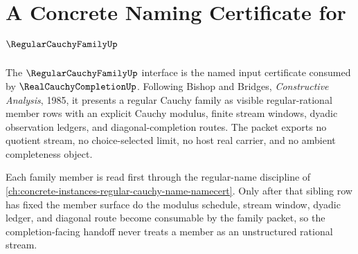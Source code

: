 \chapter{A Concrete Naming Certificate for $\RegularCauchyFamilyUp$}
\label{ch:concrete-instances-regularcauchyfamily-namecert}

The $\RegularCauchyFamilyUp$ interface is the named input certificate consumed by $\RealCauchyCompletionUp$. Following Bishop and Bridges, \emph{Constructive Analysis}, 1985, it presents a regular Cauchy family as visible regular-rational member rows with an explicit Cauchy modulus, finite stream windows, dyadic observation ledgers, and diagonal-completion routes. The packet exports no quotient stream, no choice-selected limit, no host real carrier, and no ambient completeness object.

Each family member is read first through the regular-name discipline of \autoref{ch:concrete-instances-regular-cauchy-name-namecert}. Only after that sibling row has fixed the member surface do the modulus schedule, stream window, dyadic ledger, and diagonal route become consumable by the family packet, so the completion-facing handoff never treats a member as an unstructured rational stream.

